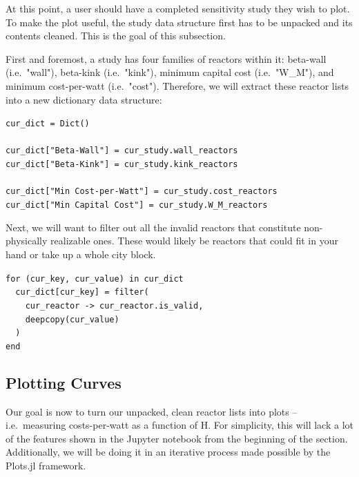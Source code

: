 At this point, a user should have a completed sensitivity study they wish to plot. To make the plot useful, the study data structure first has to be unpacked and its contents cleaned. This is the goal of this subsection.

First and foremost, a study has four families of reactors within it: beta-wall (i.e.\ "wall"), beta-kink (i.e.\ "kink"), minimum capital cost (i.e.\ "W\_M"), and minimum cost-per-watt (i.e.\ "cost"). Therefore, we will extract these reactor lists into a new dictionary data structure:

\begin{addmargin}[1.5em]{1.5em}
\texttt{cur\_dict = Dict() \\ ~ \\
cur\_dict["Beta-Wall"] = cur\_study.wall\_reactors \\
cur\_dict["Beta-Kink"] = cur\_study.kink\_reactors \\ ~ \\
cur\_dict["Min Cost-per-Watt"] = cur\_study.cost\_reactors \\
cur\_dict["Min Capital Cost"] = cur\_study.W\_M\_reactors
}
\end{addmargin}

Next, we will want to filter out all the invalid reactors that constitute non-physically realizable ones. These would likely be reactors that could fit in your hand or take up a whole city block.

\begin{addmargin}[1.5em]{1.5em}
\texttt{for (cur\_key, cur\_value) in cur\_dict \\
\-\ \-\ cur\_dict[cur\_key] = filter( \\
\-\ \-\ \-\ \-\ cur\_reactor -> cur\_reactor.is\_valid, \\
\-\ \-\ \-\ \-\ deepcopy(cur\_value) \\
\-\ \-\ ) \\
end
}
\end{addmargin}

\subsection{Plotting Curves}

Our goal is now to turn our unpacked, clean reactor lists into plots -- i.e.\ measuring costs-per-watt as a function of H. For simplicity, this will lack a lot of the features shown in the Jupyter notebook from the beginning of the section. Additionally, we will be doing it in an iterative process made possible by the Plots.jl framework.

